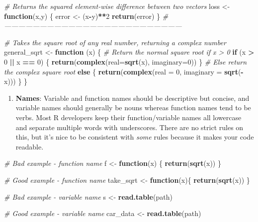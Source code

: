 \documentclass[]{book}
\newenvironment{Shaded}{\begin{snugshade}}{\end{snugshade}}
\newcommand{\KeywordTok}[1]{\textcolor[rgb]{0.13,0.29,0.53}{\textbf{#1}}}
\newcommand{\DataTypeTok}[1]{\textcolor[rgb]{0.13,0.29,0.53}{#1}}
\newcommand{\DecValTok}[1]{\textcolor[rgb]{0.00,0.00,0.81}{#1}}
\newcommand{\StringTok}[1]{\textcolor[rgb]{0.31,0.60,0.02}{#1}}
\newcommand{\CommentTok}[1]{\textcolor[rgb]{0.56,0.35,0.01}{\textit{#1}}}
\newcommand{\ControlFlowTok}[1]{\textcolor[rgb]{0.13,0.29,0.53}{\textbf{#1}}}
\newcommand{\OperatorTok}[1]{\textcolor[rgb]{0.81,0.36,0.00}{\textbf{#1}}}
\newcommand{\NormalTok}[1]{#1}
\providecommand{\tightlist}{%
  \setlength{\itemsep}{0pt}\setlength{\parskip}{0pt}}
\begin{document}
\begin{Shaded}
\begin{Highlighting}[]
\CommentTok{# Returns the squared element-wise difference between two vectors}
\NormalTok{loss <-}\StringTok{ }\ControlFlowTok{function}\NormalTok{(x,y) \{}
\NormalTok{  error <-}\StringTok{ }\NormalTok{(x}\OperatorTok{-}\NormalTok{y)}\OperatorTok{**}\DecValTok{2}
  \KeywordTok{return}\NormalTok{(error)}
\NormalTok{\}}
\CommentTok{#---------------------------------------------------------------------------}

\CommentTok{# Takes the square root of any real number, returning a complex number}
\NormalTok{general_sqrt <-}\StringTok{ }\ControlFlowTok{function}\NormalTok{ (x) \{}
  \CommentTok{# Return the normal square root if x > 0}
  \ControlFlowTok{if}\NormalTok{ (x }\OperatorTok{>}\StringTok{ }\DecValTok{0} \OperatorTok{||}\StringTok{ }\NormalTok{x }\OperatorTok{==}\StringTok{ }\DecValTok{0}\NormalTok{) \{}
    \KeywordTok{return}\NormalTok{(}\KeywordTok{complex}\NormalTok{(}\DataTypeTok{real=}\KeywordTok{sqrt}\NormalTok{(x), }\DataTypeTok{imaginary=}\DecValTok{0}\NormalTok{))}
\NormalTok{  \}}
  \CommentTok{# Else return the complex square root}
  \ControlFlowTok{else}\NormalTok{ \{}
    \KeywordTok{return}\NormalTok{(}\KeywordTok{complex}\NormalTok{(}\DataTypeTok{real =} \DecValTok{0}\NormalTok{, }\DataTypeTok{imaginary =} \KeywordTok{sqrt}\NormalTok{(}\OperatorTok{-}\NormalTok{x)))}
\NormalTok{  \}}
\NormalTok{\}}
\end{Highlighting}
\end{Shaded}

\begin{enumerate}
\def\labelenumi{\arabic{enumi}.}
\setcounter{enumi}{1}
\tightlist
\item
  \textbf{Names}: Variable and function names should be descriptive but
  concise, and variable names should generally be nouns whereas function
  names tend to be verbs. Most R developers keep their function/variable
  names all lowercase and separate multiple words with underscores.
  There are no strict rules on this, but it's nice to be consistent with
  \emph{some} rules because it makes your code readable.
\end{enumerate}

\begin{Shaded}
\begin{Highlighting}[]
\CommentTok{# Bad example - function name}
\NormalTok{f <-}\StringTok{ }\ControlFlowTok{function}\NormalTok{(x) \{}
  \KeywordTok{return}\NormalTok{(}\KeywordTok{sqrt}\NormalTok{(x))}
\NormalTok{\}}

\CommentTok{# Good example - function name}
\NormalTok{take_sqrt <-}\StringTok{ }\ControlFlowTok{function}\NormalTok{(x)\{}
  \KeywordTok{return}\NormalTok{(}\KeywordTok{sqrt}\NormalTok{(x))}
\NormalTok{\}}

\CommentTok{# Bad example - variable name}
\NormalTok{s <-}\StringTok{ }\KeywordTok{read.table}\NormalTok{(path)}

\CommentTok{# Good example - variable name}
\NormalTok{car_data <-}\StringTok{ }\KeywordTok{read.table}\NormalTok{(path)}
\end{Highlighting}
\end{Shaded}
\end{document}
